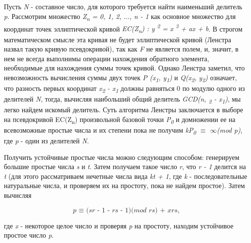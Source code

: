   Пусть \textit{N} - составное число, для которого требуется найти наименьший делитель \textit{p}. Рассмотрим множество 
\textit{Z\textsubscript{n} = {0, 1, 2, {$\dots$}, n - 1}} как основное множество для координат точек эллиптической кривой 
\textit{EC(Z\textsubscript{n}) : y\textsuperscript{ 2} = x\textsuperscript{ 3} + ax + b}. В строгом математическом смысле эта кривая 
не будет эллиптической кривой (Ленстра назвал такую кривую псевдокривой), так как \textit{F} не является полем, и, значит, в нем не 
всегда выполнимы операции нахождения обратного элемента, необходимые для нахождения суммы точек кривой. Однако Ленстра заметил, 
что невозможность вычисления суммы двух точек \textit{P (x\textsubscript{1}, y\textsubscript{1})} и \textit{Q(x\textsubscript{2}, y\textsubscript{2})} означает,
что разность первых координат \textit{x\textsubscript{2} - x\textsubscript{1}} должны равняться 0 по модулю одного из делителей \textit{N}, 
тогда, вычисляя наибольший общий делитель \textit{GCD(n, \textsubscript{2} - x\textsubscript{1})}, мы легко найдем искомый делитель. 
Суть алгоритма Ленстры заключается в выборе на псевдокривой EC(Z\textsubscript{n}) произвольной базовой точки \textit{P\textsubscript{0}} 
и домножении ее на всевозможные простые числа и их степени пока не получим \textit{kP\textsubscript{0} {$\equiv$} {$\infty$}(mod p)}, 
где \textit{p} - один из делителей \textit{N}.
 
  Получить устойчивые простые числа можно следующим способом: генерируем большие простые числа \textit{s} и \textit{t}. Затем 
получаем такое число \textit{r}, что \textit{r - 1} делится на \textit{t} (для этого рассматриваем нечетные числа вида
\textit{kt + 1}, где \textit{k} - последовательные натуральные числа, и проверяем их на простоту, пока не найдем простое). 
Затем вычисляя 

  \begin{equation}
   \textit{p {$\equiv$} (sr - 1 - rs - 1)(mod rs) + xrs,}
  \end{equation}

где \textit{x} - некоторое целое число и проверяя \textit{p} на простоту, находим устойчивое простое число \textit{p}.
  
